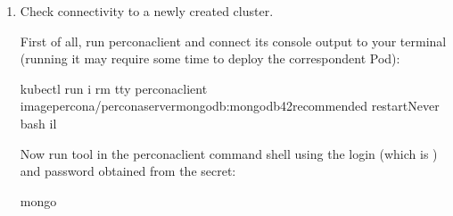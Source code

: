 \documentclass[letterpaper,10pt,english]{sphinxmanual}
\begin{document}
\begin{enumerate}
Use  command to see the list of Secrets objects (by default Secrets object you are interested in has  name). Then  will return the YAML file with generated secrets, including the 
and  strings, which should look as follows:

\begin{sphinxVerbatim}[commandchars=\\\{\}]
   
   
\end{sphinxVerbatim}

Here the actual password is base64\sphinxhyphen{}encoded, and  will bring it back to a human\sphinxhyphen{}readable form.

\item {} 
Check connectivity to a newly created cluster.

First of all, run percona\sphinxhyphen{}client and connect its console output to your
terminal (running it may require some time to deploy the correspondent Pod):

\begin{sphinxVerbatim}[commandchars=\\\{\}]
kubectl run \PYGZhy{}i \PYGZhy{}\PYGZhy{}rm \PYGZhy{}\PYGZhy{}tty percona\PYGZhy{}client \PYGZhy{}\PYGZhy{}imagepercona/percona\PYGZhy{}server\PYGZhy{}mongodb:mongodb42recommended \PYGZhy{}\PYGZhy{}restartNever \PYGZhy{}\PYGZhy{} bash \PYGZhy{}il
\end{sphinxVerbatim}

Now run  tool in the percona\sphinxhyphen{}client command shell using the login
(which is ) and password obtained from the secret:

\begin{sphinxVerbatim}[commandchars=\\\{\}]
mongo 
\end{sphinxVerbatim}

\end{enumerate}
\end{document}
